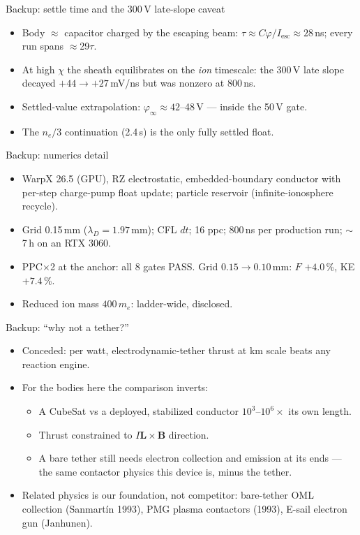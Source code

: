 \documentclass[10pt,aspectratio=169]{beamer}
\begin{document}
\begin{frame}{Backup: settle time and the 300\,V late-slope caveat}
  \begin{itemize}\small
    \item Body $\approx$ capacitor charged by the escaping beam:
          $\tau \approx C\varphi/I_{\mathrm{esc}} \approx 28$\,ns;
          every run spans $\approx$29$\tau$.
    \item At high $\chi$ the sheath equilibrates on the \emph{ion}
          timescale: the 300\,V late slope decayed $+44 \to
          +27$\,mV/ns but was nonzero at 800\,ns.
    \item Settled-value extrapolation: $\varphi_\infty \approx
          42$--48\,V --- inside the 50\,V gate.
    \item The $n_e/3$ continuation (2.4\,\textmu s) is the only
          fully settled float.
  \end{itemize}
\end{frame}

\begin{frame}{Backup: numerics detail}
  \begin{itemize}\small
    \item WarpX 26.5 (GPU), RZ electrostatic, embedded-boundary
          conductor with per-step charge-pump float update; particle
          reservoir (infinite-ionosphere recycle).
    \item Grid 0.15\,mm ($\lambda_D = 1.97$\,mm); CFL $dt$; 16 ppc;
          800\,ns per production run; $\sim$7\,h on an RTX 3060.
    \item PPC$\times$2 at the anchor: all 8 gates PASS. Grid
          $0.15\to0.10$\,mm: $F$ $+4.0$\,\%, KE $+7.4$\,\%.
    \item Reduced ion mass $400\,m_e$: ladder-wide, disclosed.
  \end{itemize}
\end{frame}

\begin{frame}{Backup: ``why not a tether?''}
  \begin{itemize}\small
    \item Conceded: per watt, electrodynamic-tether thrust at km
          scale beats any reaction engine.
    \item For the bodies here the comparison inverts:
    \begin{itemize}\small
      \item A CubeSat vs a deployed, stabilized conductor
            $10^3$--$10^6\times$ its own length.
      \item Thrust constrained to
            $I\mathbf{L}\times\mathbf{B}$ direction.
      \item A bare tether still needs electron collection and
            emission at its ends --- the same contactor physics
            this device is, minus the tether.
    \end{itemize}
    \item Related physics is our foundation, not competitor:
          bare-tether OML collection (Sanmart\'in 1993), PMG
          plasma contactors (1993), E-sail electron gun (Janhunen).
  \end{itemize}
\end{frame}
\end{document}
